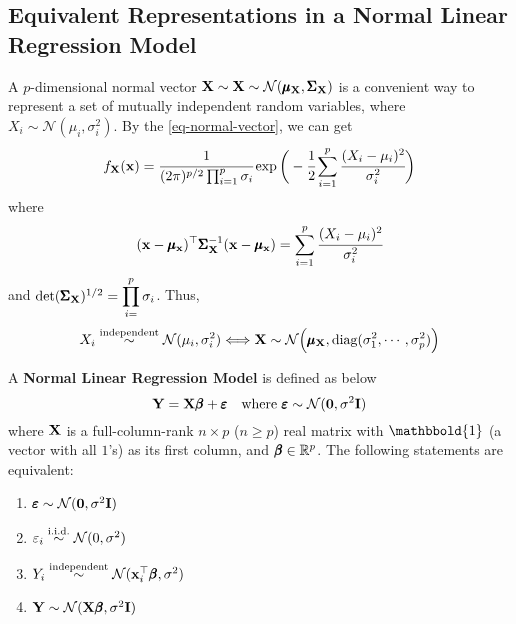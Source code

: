    \subsection{Equivalent Representations in a Normal Linear Regression Model}
    A $p$-dimensional normal vector $\mathbf{X}\sim \mathbf{X}\sim\mathcal{N}(\pmb{\mu}_{\mathbf{X}}, \pmb{\Sigma}_{\mathbf{X}})$ is a convenient way to represent a set of mutually independent random variables, where $X_i\sim \mathcal{N}(\mu_i, \sigma_i^2)$. By the \cref{eq-normal-vector}, we can get
    \begin{align*}
        \pdfn{X} = \cfrac{1}{(2\pi)^{p/2}\prod_{i = 1}^p \sigma_i}\exp\bigg( -\cfrac{1}{2}\sum_{i = 1}^p \cfrac{(X_i - \mu_i)^2}{\sigma_i^2} \bigg)
    \end{align*}
    where 
    \begin{equation}
        (\mathbf{x} - \pmb{\mu}_{\mathbf{x}})^{\top}\pmb{\Sigma}_{\mathbf{X}}^{-1}(\mathbf{x} - \pmb{\mu}_{\mathbf{x}}) =  \sum_{i = 1}^p \cfrac{(X_i - \mu_i)^2}{\sigma_i^2}
    \end{equation} and $\det(\pmb{\Sigma}_{\mathbf{X}})^{1/2} = \displaystyle \prod_{i = }^p \sigma_i$. Thus,
    \begin{equation}
        X_i \overset{\text{independent}}{\sim} \mathcal{N}(\mu_i, \sigma_i^2)\Longleftrightarrow \mathbf{X}\sim \mathcal{N}\Big(\pmb{\mu}_{\mathbf{X}}, \text{diag}(\sigma^2_1, \cdots, \sigma^2_p)\Big)
    \end{equation}
    \begin{Def}\label{normal-linear-model}
        A \textbf{Normal Linear Regression Model} is defined as below
        \begin{equation}
            \mathbf{Y} = \mathbf{X}\pmb{\beta} + \pmb{\varepsilon} \quad \text{where } \pmb{\varepsilon} \sim \mathcal{N}(\mathbf{0}, \sigma^2\mathbf{I})
        \end{equation}
        where $\mathbf{X}$ is a full-column-rank $n\times p$ ($n\geq p$) real matrix with $\mathbbold{1}$ (a vector with all $1$'s) as its first column, and $\pmb{\beta}\in \mathbb{R}^p$. The following statements are equivalent:
        \begin{enumerate}
            \item $\pmb{\varepsilon} \sim \mathcal{N}(\mathbf{0}, \sigma^2\mathbf{I})$
            \item $\varepsilon_i \overset{\text{i.i.d.}}{\sim} \mathcal{N}(0, \sigma^2)$
            \item $Y_i \overset{\text{independent}}{\sim}\mathcal{N}(\mathbf{x}_i^{\top}\pmb{\beta}, \sigma^2 )$
            \item $\mathbf{Y}\sim \mathcal{N}(\mathbf{X}\pmb{\beta}, \sigma^2\mathbf{I})$
        \end{enumerate}
    \end{Def}
    
